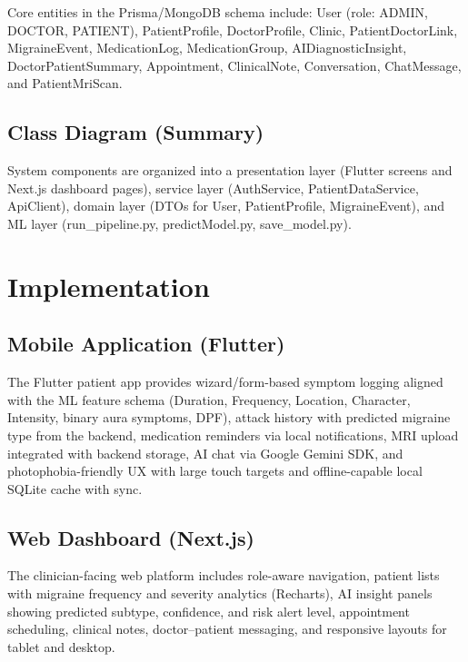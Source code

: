 \documentclass[conference,twocolumn,letterpaper]{IEEEtran}
\begin{document}
Core entities in the Prisma/MongoDB schema include: User (role: ADMIN, DOCTOR, PATIENT), PatientProfile, DoctorProfile, Clinic, PatientDoctorLink, MigraineEvent, MedicationLog, MedicationGroup, AIDiagnosticInsight, DoctorPatientSummary, Appointment, ClinicalNote, Conversation, ChatMessage, and PatientMriScan.

\subsection{Class Diagram (Summary)}
System components are organized into a presentation layer (Flutter screens and Next.js dashboard pages), service layer (AuthService, PatientDataService, ApiClient), domain layer (DTOs for User, PatientProfile, MigraineEvent), and ML layer (run\_pipeline.py, predictModel.py, save\_model.py).

\section{Implementation}

\subsection{Mobile Application (Flutter)}
The Flutter patient app provides wizard/form-based symptom logging aligned with the ML feature schema (Duration, Frequency, Location, Character, Intensity, binary aura symptoms, DPF), attack history with predicted migraine type from the backend, medication reminders via local notifications, MRI upload integrated with backend storage, AI chat via Google Gemini SDK, and photophobia-friendly UX with large touch targets and offline-capable local SQLite cache with sync.

\subsection{Web Dashboard (Next.js)}
The clinician-facing web platform includes role-aware navigation, patient lists with migraine frequency and severity analytics (Recharts), AI insight panels showing predicted subtype, confidence, and risk alert level, appointment scheduling, clinical notes, doctor--patient messaging, and responsive layouts for tablet and desktop.
\end{document}

